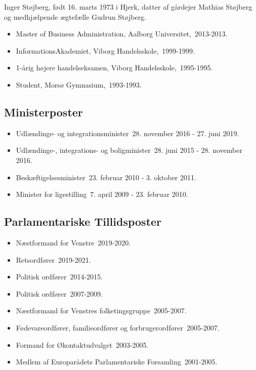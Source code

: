 \documentclass[11pt, a4paper]{awesome-cv}
\begin{document}
\makecvheader[R]
\makelettertitle
\begin{cvletter}
Inger Støjberg, født 16. marts 1973 i Hjerk, datter af gårdejer Mathias Støjberg og medhjælpende ægtefælle Gudrun Støjberg.

\begin{itemize}
\item Master of Business Administration, Aalborg Universitet, 2013-2013.
\item InformationsAkademiet, Viborg Handelsskole, 1999-1999.
\item 1-årig højere handelseksamen, Viborg Handelsskole, 1995-1995.
\item Student, Morsø Gymnasium, 1993-1993.
\end{itemize}
\subsection*{Ministerposter}
\begin{itemize}
\item Udlændinge- og integrationsminister 28. november 2016 - 27. juni 2019.
\item Udlændinge-, integrations- og boligminister 28. juni 2015 - 28. november 2016.
\item Beskæftigelsesminister 23. februar 2010 - 3. oktober 2011.
\item Minister for ligestilling 7. april 2009 - 23. februar 2010.
\end{itemize}
\subsection*{Parlamentariske Tillidsposter}
\begin{itemize}
\item Næstformand for Venstre 2019-2020.
\item Retsordfører 2019-2021.
\item Politisk ordfører 2014-2015.
\item Politisk ordfører 2007-2009.
\item Næstformand for Venstres folketingsgruppe 2005-2007.
\item Fødevareordfører, familieordfører og forbrugerordfører 2005-2007.
\item Formand for Økontaktudvalget 2003-2005.
\item Medlem af Europarådets Parlamentariske Forsamling 2001-2005.
\end{itemize}

\end{cvletter}
\end{document}
